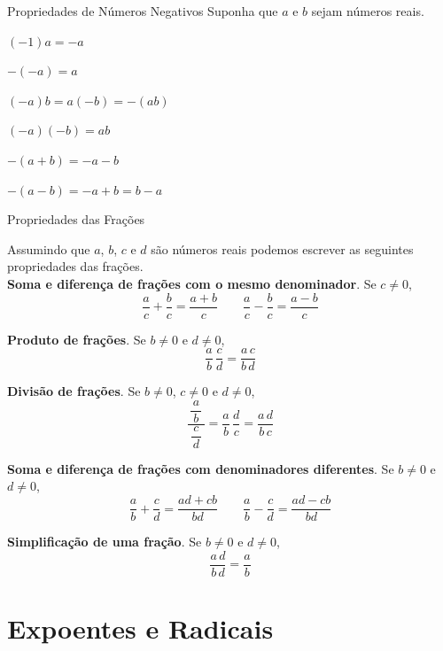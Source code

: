 \begin{teoria}{Propriedades de Números Negativos}
    Suponha que $a$ e $b$ sejam números reais.
    \begin{propriedades}
        \item $(-1)a = -a$
        \item $-(-a) = a$
        \item $(-a)b = a(-b) = -(ab)$
        \item $(-a)(-b) = ab$
        \item $-(a + b) = -a - b$
        \item $-(a - b) = -a + b = b - a$
    \end{propriedades}
\end{teoria}

\begin{teoria}{Propriedades das Frações}
    
    Assumindo que $a$, $b$, $c$ e $d$ são números reais podemos escrever as seguintes propriedades das frações.
    \\
    
    \textbf{Soma e diferença de frações com o mesmo denominador}. Se $c\neq 0$,
    \[  \frac{a}{c} + \frac{b}{c} = \frac{a+b}{c}
        \qquad
        \frac{a}{c} - \frac{b}{c} = \frac{a-b}{c}
    \]
    
    \textbf{Produto de frações}. Se $b\neq 0$ e $d\neq 0$,
    \[ \frac{a}{b} \, \frac{c}{d} = \frac{a\,c}{b\,d}
    \]
    
    \textbf{Divisão de frações}. Se $b\neq 0$, $c\neq 0$ e $d\neq 0$, 
    \[ \dfrac{\,\dfrac{\,a\,}{b}\,}{\dfrac{\,c\,}{d}} = \frac{a}{b}\,\frac{d}{c} = \frac{a\,d}{b\,c}\]
    
    \textbf{Soma e diferença de frações com denominadores diferentes}. Se $b\neq 0$ e $d\neq 0$,
    \[  \frac{a}{b} + \frac{c}{d} = \frac{ad+cb}{bd}
        \qquad
        \frac{a}{b} - \frac{c}{d} = \frac{ad-cb}{bd}
    \]
     
    \textbf{Simplificação de uma fração}. Se $b\neq 0$ e $d\neq 0$,
    \[ \frac{a\,d}{b\,d} = \frac{a}{b} \]
    
\end{teoria}

\section{Expoentes e Radicais}

